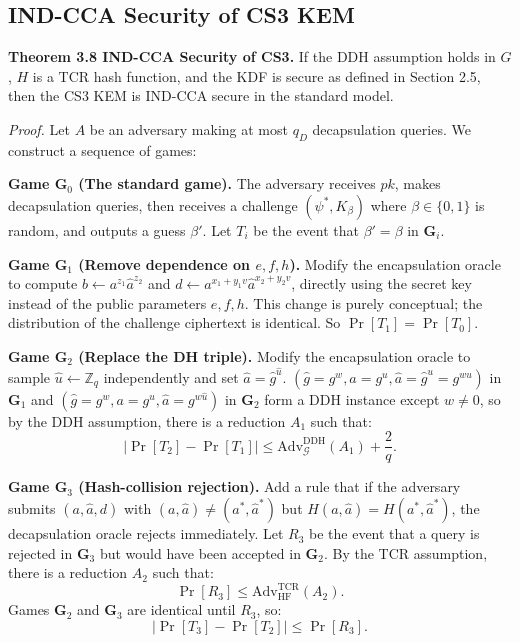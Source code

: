 \subsection{IND-CCA Security of CS3 KEM}

\noindent\textbf{Theorem 3.8 IND-CCA Security of CS3.} If the DDH assumption holds in $G$, $H$ is a TCR hash function, and the KDF is secure as defined in Section 2.5, then the CS3 KEM is IND-CCA secure in the standard model.

\noindent\textit{Proof.} Let $A$ be an adversary making at most $q_D$ decapsulation queries. We construct a sequence of games:

\vspace{0.5em}
\noindent\textbf{Game $\mathbf{G}_0$ (The standard game).} 
The adversary receives $pk$, makes decapsulation queries, then receives a challenge $(\psi^*, K_\beta)$ where $\beta \in \{0,1\}$ is random, and outputs a guess $\beta'$. Let $T_i$ be the event that $\beta'=\beta$ in $\mathbf{G}_i$.

\vspace{0.5em}
\noindent\textbf{Game $\mathbf{G}_1$ (Remove dependence on $e, f, h$).} 
Modify the encapsulation oracle to compute $b \gets a^{z_1} \hat{a}^{z_2}$ and $d \gets a^{x_1 + y_1 v} \hat{a}^{x_2 + y_2 v}$, directly using the secret key instead of the public parameters $e, f, h$. This change is purely conceptual; the distribution of the challenge ciphertext is identical. So $\Pr[T_1] = \Pr[T_0]$. 

\vspace{0.5em}
\noindent\textbf{Game $\mathbf{G}_2$ (Replace the DH triple).} 
Modify the encapsulation oracle to sample $\hat{u} \gets \mathbb{Z}_q$ independently and set $\hat{a} = \hat{g}^{\hat{u}}$. 
$(\hat{g} = g^w, a = g^u, \hat{a} = \hat{g}^{u} = g^{wu})$ in $\mathbf{G}_1$ and $(\hat{g} = g^w, a = g^u, \hat{a} = g^{w\hat{u}})$ in $\mathbf{G}_2$ form a DDH instance except $w \neq 0$, so by the DDH assumption, there is a reduction $A_1$ such that:
$$
|\Pr[T_2] - \Pr[T_1]| \le \text{Adv}_{\mathcal{G}}^{\text{DDH}}(A_1) + \frac{2}{q}.
$$

\vspace{0.5em}
\noindent\textbf{Game $\mathbf{G}_3$ (Hash-collision rejection).} 
Add a rule that if the adversary submits $(a, \hat{a}, d)$ with $(a, \hat{a}) \neq (a^*, \hat{a}^*)$ but $H(a, \hat{a}) = H(a^*, \hat{a}^*)$, the decapsulation oracle rejects immediately. 
Let $R_3$ be the event that a query is rejected in $\mathbf{G}_3$ but would have been accepted in $\mathbf{G}_2$. By the TCR assumption, there is a reduction $A_2$ such that:
$$
\Pr[R_3] \le \text{Adv}_{\mathrm{HF}}^{\text{TCR}}(A_2).
$$
Games $\mathbf{G}_2$ and $\mathbf{G}_3$ are identical until $R_3$, so:
$$
|\Pr[T_3] - \Pr[T_2]| \le \Pr[R_3].
$$

